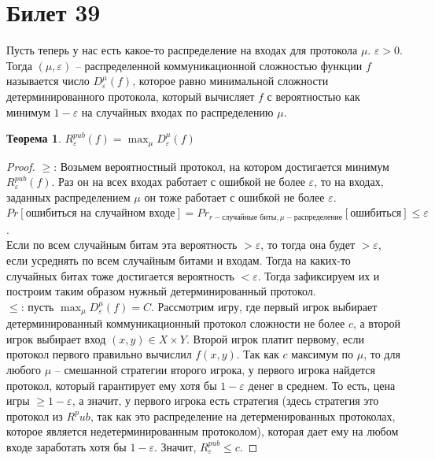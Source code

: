 \documentclass[12pt, letterpaper]{article}
\newtheorem{theorem}{Теорема}[section]
\newcommand{\e}{\varepsilon}
\begin{document}
\section{Билет 39}
Пусть теперь у нас есть какое-то распределение на входах для протокола $\mu$. $\e > 0$. Тогда $(\mu, \e)$ -- распределенной коммуникационной сложностью функции $f$ называется число $D^{\mu}_\e (f)$, которое равно минимальной сложности детерминированного протокола, который вычисляет $f$ с вероятностью как минимум $1-\e$ на случайных входах по распределению $\mu$.
\begin{theorem} 
$R^{pub}_\e (f) = \max_{\mu} D_\e^{\mu} (f)$
\end{theorem}
\begin{proof}
$\geq$: Возьмем вероятностный протокол, на котором достигается минимум $R^{pub}_\e(f)$. Раз он на всех входах работает с ошибкой не более $\e$, то на входах, заданных распределением $\mu$ он тоже работает с ошибкой не более $\e$. \\
$Pr[\text{ошибиться на случайном входе}] = Pr_{r - \text{случайные биты}, \mu - \text{распределение}}[\text{ошибиться}] \leq \e$. \\
Если по всем случайным битам эта вероятность $>\e$, то тогда она будет $>\e$, если усреднять по всем случайным битами и входам. Тогда на каких-то случайных битах тоже достигается вероятность $<\e$. Тогда зафиксируем их и построим таким образом нужный детерминированный протокол.\\
$\leq$: пусть $\max_{\mu} D_\e^{\mu} (f) = C$. Рассмотрим игру, где первый игрок выбирает детерминированный коммуникационный протокол сложности не более $c$, а второй игрок выбирает вход $(x,y) \in X \times Y$. Второй игрок платит первому, если протокол первого правильно вычислил $f(x,y)$. Так как $c$ максимум по $\mu$, то для любого $\mu$ -- смешанной стратегии второго игрока, у первого игрока найдется протокол, который гарантирует ему хотя бы $1-\e$ денег в среднем. То есть, цена игры $\geq 1-\e$, а значит, у первого игрока есть стратегия (здесь стратегия это протокол из $R^pub$, так как это распределение на детерменированных протоколах, которое является недетерминированным протоколом), которая дает ему на любом входе заработать хотя бы $1-\e$. Значит, $R^{pub}_\e \leq c$.
\end{proof}
\end{document}
